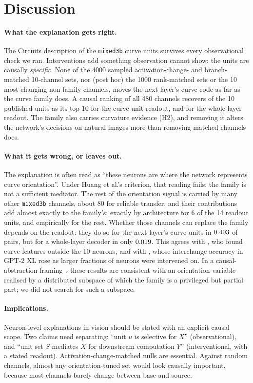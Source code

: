 \documentclass[11pt]{article}
\begin{document}
\section{Discussion}
\paragraph{What the explanation gets right.}
The Circuits description of the \texttt{mixed3b} curve units survives every observational check we ran. Interventions add something observation cannot show: the units are causally \emph{specific}. None of the 4000 sampled activation-change- and branch-matched 10-channel sets, nor (post hoc) the 1000 rank-matched sets or the 10 most-changing non-family channels, moves the next layer's curve code as far as the curve family does. A causal ranking of all 480 channels recovers \AuTopOverlap{} of the 10 published units as its top 10 for the curve-unit readout, and \TrRidgeOverlap{} for the whole-layer readout. The family also carries curvature evidence (H2), and removing it alters the network's decisions on natural images more than removing matched channels does.

\paragraph{What it gets wrong, or leaves out.}
The explanation is often read as ``these neurons are where the network represents curve orientation''. Under Huang et al.'s criterion, that reading fails: the family is not a sufficient mediator. The rest of the orientation signal is carried by many other \texttt{mixed3b} channels, about 80 for reliable transfer, and their contributions add almost exactly to the family's: exactly by architecture for 6 of the 14 readout units, and empirically for the rest. Whether those channels can replace the family depends on the readout: they do so for the next layer's curve units in $0.403$ of pairs, but for a whole-layer decoder in only $0.019$. This agrees with \citet{gorton2024missing}, who found curve features outside the 10 neurons, and with \citet{huang2023rigorously}, whose interchange accuracy in GPT-2 XL rose as larger fractions of neurons were intervened on. In a causal-abstraction framing~\cite{geiger2023abstraction}, these results are consistent with an orientation variable realised by a distributed subspace of which the family is a privileged but partial part; we did not search for such a subspace.

\paragraph{Implications.}
Neuron-level explanations in vision should be stated with an explicit causal scope. Two claims need separating: ``unit $u$ is selective for $X$'' (observational), and ``unit set $S$ mediates $X$ for downstream computation $Y$'' (interventional, with a stated readout). Activation-change-matched nulls are essential. Against random channels, almost any orientation-tuned set would look causally important, because most channels barely change between base and source.
\end{document}
